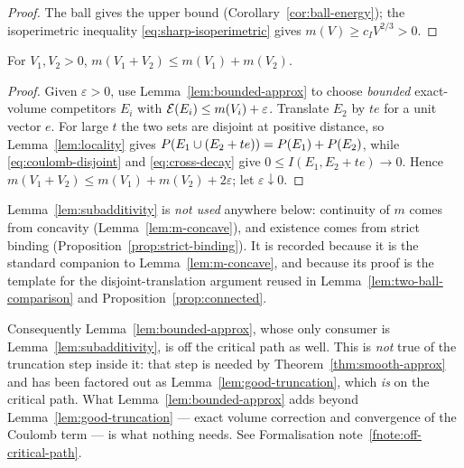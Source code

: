 \begin{proof}
The ball gives the upper bound (Corollary~\ref{cor:ball-energy}); the
isoperimetric inequality \eqref{eq:sharp-isoperimetric} gives
$m(V)\ge c_IV^{2/3}>0$.
\end{proof}

\begin{lemma}[Subadditivity]\label{lem:subadditivity}
For $V_1,V_2>0$, $m(V_1+V_2)\le m(V_1)+m(V_2)$.
\end{lemma}

\begin{proof}
Given $\varepsilon>0$, use Lemma~\ref{lem:bounded-approx} to choose
\emph{bounded} exact-volume competitors $E_i$ with
$\mathcal E(E_i)\le m(V_i)+\varepsilon$.  Translate $E_2$ by $te$ for a unit vector
$e$.  For large $t$ the two sets are disjoint at positive distance, so
Lemma~\ref{lem:locality} gives $P(E_1\cup(E_2+te))=P(E_1)+P(E_2)$,
while \eqref{eq:coulomb-disjoint} and \eqref{eq:cross-decay} give
$0\le I(E_1,E_2+te)\to0$.  Hence
$m(V_1+V_2)\le m(V_1)+m(V_2)+2\varepsilon$; let
$\varepsilon\downarrow0$.
\end{proof}

\begin{fnote}\label{fnote:subadditivity-unused}
Lemma~\ref{lem:subadditivity} is \emph{not used} anywhere below: continuity of
$m$ comes from concavity (Lemma~\ref{lem:m-concave}), and existence comes from
strict binding (Proposition~\ref{prop:strict-binding}).  It is recorded because
it is the standard companion to Lemma~\ref{lem:m-concave}, and because its
proof is the template for the disjoint-translation argument reused in
Lemma~\ref{lem:two-ball-comparison} and Proposition~\ref{prop:connected}.

Consequently Lemma~\ref{lem:bounded-approx}, whose only consumer is
Lemma~\ref{lem:subadditivity}, is off the critical path as well.  This is
\emph{not} true of the truncation step inside it: that step is needed by
Theorem~\ref{thm:smooth-approx} and has been factored out as
Lemma~\ref{lem:good-truncation}, which \emph{is} on the critical path.  What
Lemma~\ref{lem:bounded-approx} adds beyond
Lemma~\ref{lem:good-truncation} --- exact volume correction and convergence of
the Coulomb term --- is what nothing needs.  See Formalisation
note~\ref{fnote:off-critical-path}.
\end{fnote}

